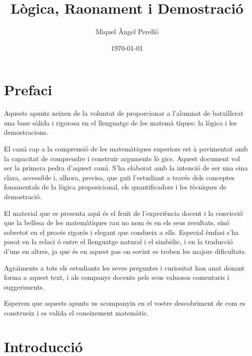 \documentclass[12pt,a4paper,oneside]{book}
\theoremstyle{plain}
\theoremstyle{definition}
\theoremstyle{remark}
\numberwithin{equation}{section}
\begin{document}
\frontmatter
\title{Lògica, Raonament i Demostració}
\author{Miquel Àngel Perelló}
\date{\today}
\maketitle
\tableofcontents
\frontmatter

\pagecolor{fons!20}

\let\cleardoublepage\clearpage

\chapter*{Prefaci}

Aquests apunts neixen de la voluntat de proporcionar a l'alumnat de
batxillerat una base s\`{o}lida i rigorosa en el llenguatge de les matem\`{a}%
tiques: la l\`{o}gica i les demostracions.

El cam\'{\i} cap a la comprensi\'{o} de les matem\`{a}tiques superiors est%
\`{a} pavimentat amb la capacitat de comprendre i construir arguments l\`{o}%
gics. Aquest document vol ser la primera pedra d'aquest cam\'{\i}. S'ha
elaborat amb la intenci\'{o} de ser una eina clara, accessible i, alhora,
precisa, que gui\"{\i} l'estudiant a trav\'{e}s dels conceptes fonamentals
de la l\`{o}gica proposicional, els quantificadors i les t\`{e}cniques de
demostraci\'{o}.

El material que es presenta aqu\'{\i} \'{e}s el fruit de l'experi\`{e}ncia
docent i la convicci\'{o} que la bellesa de les matem\`{a}tiques rau no nom%
\'{e}s en els seus resultats, sin\'{o} sobretot en el proc\'{e}s rigor\'{o}s
i elegant que condueix a ells. Especial \`{e}mfasi s'ha posat en la relaci%
\'{o} entre el llenguatge natural i el simb\`{o}lic, i en la traducci\'{o}
d'uns en altres, ja que \'{e}s en aquest pas on sovint es troben les majors
dificultats.

Agra\"{\i}ments a tots els estudiants les seves preguntes i curiositat han
anat donant forma a aquest text, i als companys docents pels seus valuosos
comentaris i suggeriments.

Esperem que aquests apunts us acompanyin en el vostre descobriment de com es
construeix i es valida el coneixement matem\`{a}tic.

\let\cleardoublepage\clearpage

\chapter{Introducci\'{o}}
\end{document}
